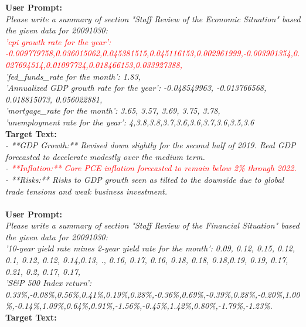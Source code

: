 \textbf{User Prompt:}\\
{\footnotesize
\textit{
Please write a summary of section "Staff Review of the Economic Situation" based the given data for 20091030: \\
\textcolor{red}{'cpi growth rate for the year': -0.009779758,0.036015062,0.045381515,0.045116153,0.002961999,-0.003901354,0.027694514,0.01097724,0.018466153,0.033927388,}\\
'fed\_funds\_rate for the month': 1.83, \\
'Annualized GDP growth rate for the year': -0.048549963, -0.013766568, 0.018815073, 0.056022881, \\
'mortgage\_rate for the month': 3.65, 3.57, 3.69, 3.75, 3.78, \\
'unemployment rate for the year': 4,3.8,3.8,3.7,3.6,3.6,3.7,3.6,3.5,3.6}
}\\
\textbf{Target Text:}\\
{\footnotesize
\textit{
    - **GDP Growth:** Revised down slightly for the second half of 2019. Real GDP forecasted to decelerate modestly over the medium term.\\
    - \textcolor{red}{**Inflation:** Core PCE inflation forecasted to remain below 2\% through 2022.}\\
    - **Risks:** Risks to GDP growth seen as tilted to the downside due to global trade tensions and weak business investment.
}}\\
~\\
\textbf{User Prompt:}\\
{\footnotesize
\textit{
Please write a summary of section "Staff Review of the Financial Situation" based the given data for 20091030: \\
'10-year yield rate mines 2-year yield rate for the month': 0.09, 0.12, 0.15, 0.12, 0.1, 0.12, 0.12, 0.14,0.13, ., 0.16, 0.17, 0.16, 0.18, 0.18, 0.18,0.19, 0.19, 0.17, 0.21, 0.2, 0.17, 0.17, \\
'S\&P 500 Index return': 0.33\%,-0.08\%,0.56\%,0.41\%,0.19\%,0.28\%,-0.36\%,0.69\%,-0.39\%,0.28\%,-0.20\%,1.00\%,-0.14\%,1.09\%,0.64\%,0.91\%,-1.56\%,-0.45\%,1.42\%,0.80\%,-1.79\%,-1.23\%.}
}\\
\textbf{Target Text:}\\
